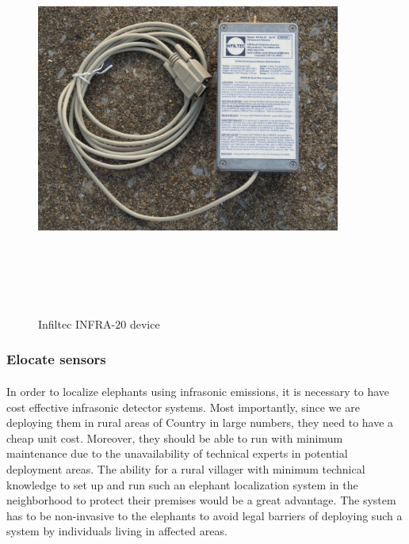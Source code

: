 \documentclass[12pt]{article}
\numberwithin{figure}{section}
\numberwithin{table}{section}
\begin{document}
\begin{figure}[H]
\centering
\includegraphics[width=10cm,height=13cm,keepaspectratio]{INFRA_20.jpg}
\caption{Infiltec INFRA-20 device}
\label{d:p12}
\end{figure}


\newpage
\subsubsection{Elocate sensors}

\paragraph{}
In order to localize elephants using infrasonic emissions, it is necessary to have cost effective infrasonic detector systems. Most importantly, since we are deploying them in rural areas of Country in large numbers, they need to have a cheap unit cost. Moreover, they should be able to run with minimum maintenance due to the unavailability of technical experts in potential deployment areas. The ability for a rural villager with minimum technical knowledge to set up and run such an elephant localization system in the neighborhood to protect their premises would be a great advantage. The system has to be non-invasive to the elephants to avoid legal barriers of deploying such a system by individuals living in affected areas.
\end{document}
